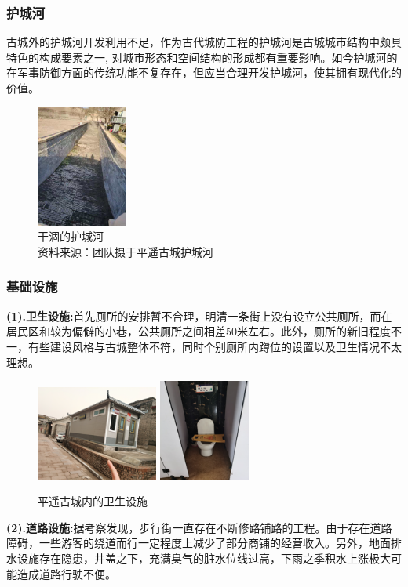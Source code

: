 \documentclass[UTF8]{ctexart}
\begin{document}
        \subsubsection{护城河}
        古城外的护城河开发利用不足，作为古代城防工程的护城河是古城城市结构中颇具特色的构成要素之一, 对城市形态和空间结构的形成都有重要影响。如今护城河的在军事防御方面的传统功能不复存在，但应当合理开发护城河，使其拥有现代化的价值。
        \begin{figure}[H]
            \centering
            \includegraphics[width=3cm]{图片 29.png}
            \caption[plain]{干涸的护城河\\资料来源：团队摄于平遥古城护城河}
        \end{figure}
        \subsubsection{基础设施}
\textbf{(1).卫生设施:}首先厕所的安排暂不合理，明清一条街上没有设立公共厕所，而在居民区和较为偏僻的小巷，公共厕所之间相差50米左右。此外，厕所的新旧程度不一，有些建设风格与古城整体不符，同时个别厕所内蹲位的设置以及卫生情况不太理想。
\begin{figure}[H]
    \centering
    \includegraphics[width=4cm]{图片 1.png}
    \includegraphics[width=3cm]{图片 3.png}
    \caption{平遥古城内的卫生设施\\}
    \label{fig:my_label}
\end{figure}
\textbf{(2).道路设施:}据考察发现，步行街一直存在不断修路铺路的工程。由于存在道路障碍，一些游客的绕道而行一定程度上减少了部分商铺的经营收入。另外，地面排水设施存在隐患，井盖之下，充满臭气的脏水位线过高，下雨之季积水上涨极大可能造成道路行驶不便。
\end{document}
